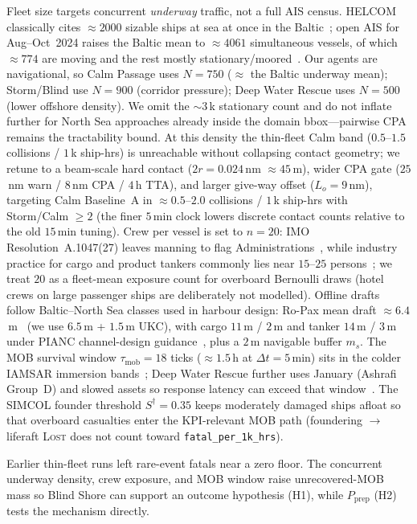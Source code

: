 \documentclass[cameraready]{Interspeech}
\begin{document}
Fleet size targets concurrent \emph{underway} traffic, not a full AIS census. HELCOM classically cites ${\approx}2000$ sizable ships at sea at once in the Baltic~\cite{helcom2010}; open AIS for Aug--Oct~2024 raises the Baltic mean to ${\approx}4061$ simultaneous vessels, of which ${\approx}774$ are moving and the rest mostly stationary/moored~\cite{huetten2025baltic}. Our agents are navigational, so Calm Passage uses $N=750$ (${\approx}$ the Baltic underway mean); Storm/Blind use $N=900$ (corridor pressure); Deep Water Rescue uses $N=500$ (lower offshore density). We omit the ${\sim}3$\,k stationary count and do not inflate further for North Sea approaches already inside the domain bbox---pairwise CPA remains the tractability bound. At this density the thin-fleet Calm band ($0.5$--$1.5$ collisions / $1$\,k ship-hrs) is unreachable without collapsing contact geometry; we retune to a beam-scale hard contact ($2r=0.024$\,nm ${\approx}45$\,m), wider CPA gate ($25$\,nm warn / $8$\,nm CPA / $4$\,h TTA), and larger give-way offset ($L_o=9$\,nm), targeting Calm Baseline~A in ${\approx}0.5$--$2.0$ collisions / $1$\,k ship-hrs with Storm/Calm ${\geq}2$ (the finer $5$\,min clock lowers discrete contact counts relative to the old $15$\,min tuning). Crew per vessel is set to $n=20$: IMO Resolution~A.1047(27) leaves manning to flag Administrations~\cite{imo1047}, while industry practice for cargo and product tankers commonly lies near $15$--$25$ persons~\cite{helcom2010}; we treat $20$ as a fleet-mean exposure count for overboard Bernoulli draws (hotel crews on large passenger ships are deliberately not modelled). Offline drafts follow Baltic--North Sea classes used in harbour design: Ro-Pax mean draft ${\approx}6.4$\,m~\cite{gucma2018ropax} (we use $6.5$\,m + $1.5$\,m UKC), with cargo $11$\,m / $2$\,m and tanker $14$\,m / $3$\,m under PIANC channel-design guidance~\cite{pianc2014}, plus a $2$\,m navigable buffer $m_s$. The MOB survival window $\tau_{\text{mob}}=18$ ticks (${\approx}1.5$\,h at $\Delta t=5$\,min) sits in the colder IAMSAR immersion bands~\cite{imosar2018,tipton2022survival}; Deep Water Rescue further uses January (Ashrafi Group~D) and slowed assets so response latency can exceed that window~\cite{ashrafi2024}. The SIMCOL founder threshold $S^{\dagger}=0.35$ keeps moderately damaged ships afloat so that overboard casualties enter the KPI-relevant MOB path (foundering $\to$ liferaft \textsc{Lost} does not count toward \texttt{fatal\_per\_1k\_hrs}).

Earlier thin-fleet runs left rare-event fatals near a zero floor. The concurrent underway density, crew exposure, and MOB window raise unrecovered-MOB mass so Blind Shore can support an outcome hypothesis (H1), while $P_{\text{prep}}$ (H2) tests the mechanism directly.
\end{document}
